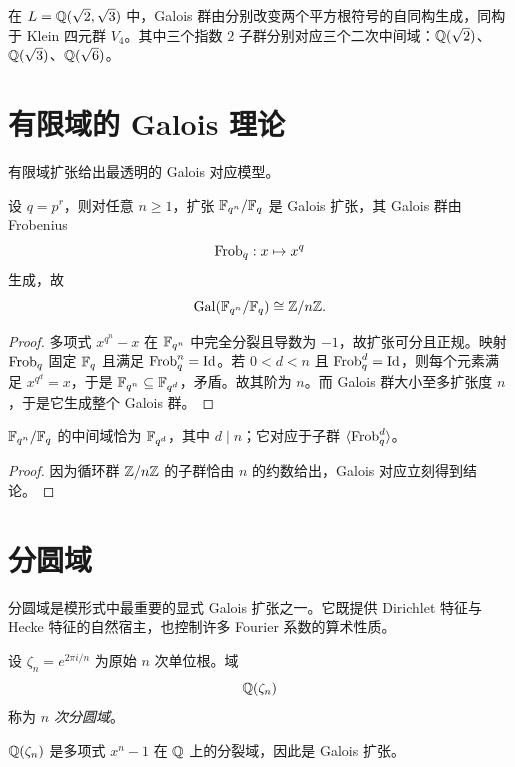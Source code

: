 \begin{example}
在 $L=\mathbb{Q}(\sqrt2,\sqrt3)$ 中，Galois 群由分别改变两个平方根符号的自同构生成，同构于 Klein 四元群 $V_4$。其中三个指数 $2$ 子群分别对应三个二次中间域：$\mathbb{Q}(\sqrt2)$、$\mathbb{Q}(\sqrt3)$、$\mathbb{Q}(\sqrt6)$。
\end{example}

\section{有限域的 Galois 理论}

有限域扩张给出最透明的 Galois 对应模型。

\begin{theorem}
设 $q=p^r$，则对任意 $n\ge 1$，扩张 $\mathbb{F}_{q^n}/\mathbb{F}_q$ 是 Galois 扩张，其 Galois 群由 Frobenius
\[
 \mathrm{Frob}_q:x\mapsto x^q
\]
生成，故
\[
 \mathrm{Gal}(\mathbb{F}_{q^n}/\mathbb{F}_q)\cong \mathbb{Z}/n\mathbb{Z}.
\]
\end{theorem}

\begin{proof}
多项式 $x^{q^n}-x$ 在 $\mathbb{F}_{q^n}$ 中完全分裂且导数为 $-1$，故扩张可分且正规。映射 $\mathrm{Frob}_q$ 固定 $\mathbb{F}_q$ 且满足 $\mathrm{Frob}_q^n=\mathrm{Id}$。若 $0<d<n$ 且 $\mathrm{Frob}_q^d=\mathrm{Id}$，则每个元素满足 $x^{q^d}=x$，于是 $\mathbb{F}_{q^n}\subseteq \mathbb{F}_{q^d}$，矛盾。故其阶为 $n$。而 Galois 群大小至多扩张度 $n$，于是它生成整个 Galois 群。
\end{proof}

\begin{corollary}
$\mathbb{F}_{q^n}/\mathbb{F}_q$ 的中间域恰为 $\mathbb{F}_{q^d}$，其中 $d\mid n$；它对应于子群 $\langle \mathrm{Frob}_q^d\rangle$。
\end{corollary}

\begin{proof}
因为循环群 $\mathbb{Z}/n\mathbb{Z}$ 的子群恰由 $n$ 的约数给出，Galois 对应立刻得到结论。
\end{proof}

\section{分圆域}

分圆域是模形式中最重要的显式 Galois 扩张之一。它既提供 Dirichlet 特征与 Hecke 特征的自然宿主，也控制许多 Fourier 系数的算术性质。

\begin{definition}
设 $\zeta_n=e^{2\pi i/n}$ 为原始 $n$ 次单位根。域
\[
 \mathbb{Q}(\zeta_n)
\]
称为 \emph{$n$ 次分圆域}。
\end{definition}

\begin{proposition}
$\mathbb{Q}(\zeta_n)$ 是多项式 $x^n-1$ 在 $\mathbb{Q}$ 上的分裂域，因此是 Galois 扩张。
\end{proposition}

